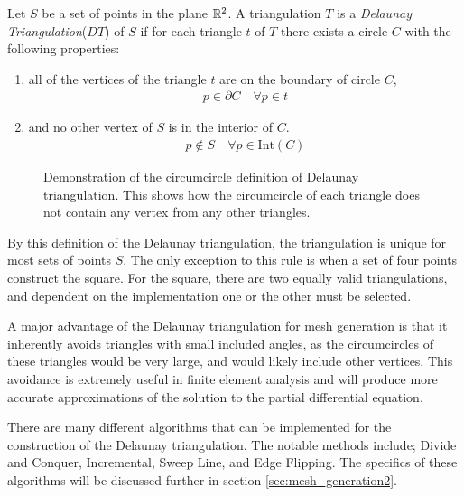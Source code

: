 \documentclass[../fem.tex]{subfile}
\begin{document}
\begin{definition}
   Let $S$ be a set of points in the plane $\mathbb{R}^2$. A triangulation $T$ is a
   \textit{Delaunay Triangulation}($DT$) of $S$ if for each triangle $t$ of $T$
   there exists a circle $C$ with the following properties:
   \begin{enumerate}
     \item all of the vertices of the triangle $t$ are on the boundary of
       circle $C$,
       \begin{align*}
          p\in\partial C\quad\forall p\in t
       \end{align*}
     \item and no other vertex of $S$ is in the interior of $C$.
       \begin{align*}
         p\notin S\quad\forall p\in\text{Int}(C)
       \end{align*}
   \end{enumerate}
\end{definition}

\begin{figure}[htpb]
  \centering
  
  \caption{Demonstration of the circumcircle definition of Delaunay
  triangulation. This shows how the circumcircle of each triangle does not
contain any vertex from any other triangles.}
\label{fig:circumcircle}
\end{figure}

By this definition of the Delaunay triangulation, the triangulation is unique
for most sets of points $S$. The only exception to this rule is when a set of
four points construct the square. For the square, there are two equally valid
triangulations, and dependent on the implementation one or the other must be
selected.

A major advantage of the Delaunay triangulation for mesh generation is that it
inherently avoids triangles with small included angles, as the circumcircles of
these triangles would be very large, and would likely include other vertices.
This avoidance is extremely useful in finite element analysis and will produce
more accurate approximations of the solution to the partial differential
equation.

There are many different algorithms that can be implemented for the
construction of the Delaunay triangulation. The notable methods include; Divide
and Conquer, Incremental, Sweep Line, and Edge Flipping. The specifics of these
algorithms will be discussed further in section \ref{sec:mesh_generation2}.
\end{document}
